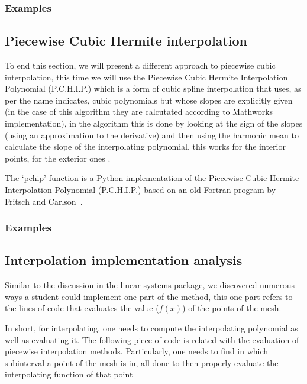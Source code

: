 \subsubsection{Examples}



\subsection{Piecewise Cubic Hermite interpolation}
To end this section, we will present a different approach to piecewise cubic interpolation, this time we will use the Piecewise Cubic Hermite Interpolation Polynomial (P.C.H.I.P.) which is a form of cubic spline interpolation that uses, as per the name indicates, cubic polynomials but whose slopes are explicitly given (in the case of this algorithm they are calcutated according to Mathworks implementation), in the algorithm this is done by looking at the sign of the slopes (using an approximation to the derivative) and then using the harmonic mean to calculate the slope of the interpolating polynomial, this works for the interior points, for the exterior ones . 

The `pchip' function is a Python implementation of the Piecewise Cubic Hermite Interpolation Polynomial (P.C.H.I.P.) based on an old Fortran program by Fritsch and Carlson~\cite{doi:10.1137/0717021}.

\subsubsection{Examples}
	



\subsection{Interpolation implementation analysis}

Similar to the discussion in the linear systems package, we discovered numerous ways a student could implement one part of the method, this one part refers to the lines of code that evaluates the value ($f(x)$) of the points of the mesh. 

In short, for interpolating, one needs to compute the interpolating polynomial as well as evaluating it. The following piece of code is related with the evaluation of piecewise interpolation methods. Particularly, one needs to find in which subinterval a point of the mesh is in, all done to then properly evaluate the interpolating function of that point

